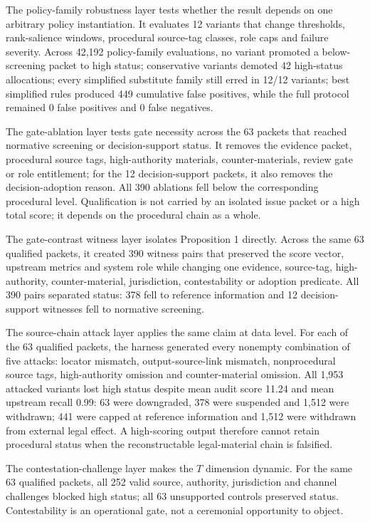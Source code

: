 \documentclass[12pt,a4paper]{article}
\begin{document}
The policy-family robustness layer tests whether the result depends on one arbitrary policy instantiation. It evaluates 12 variants that change thresholds, rank-salience windows, procedural source-tag classes, role caps and failure severity. Across 42,192 policy-family evaluations, no variant promoted a below-screening packet to high status; conservative variants demoted 42 high-status allocations; every simplified substitute family still erred in 12/12 variants; best simplified rules produced 449 cumulative false positives, while the full protocol remained 0 false positives and 0 false negatives.

The gate-ablation layer tests gate necessity across the 63 packets that reached normative screening or decision-support status. It removes the evidence packet, procedural source tags, high-authority materials, counter-materials, review gate or role entitlement; for the 12 decision-support packets, it also removes the decision-adoption reason. All 390 ablations fell below the corresponding procedural level. Qualification is not carried by an isolated issue packet or a high total score; it depends on the procedural chain as a whole.

The gate-contrast witness layer isolates Proposition 1 directly. Across the same 63 qualified packets, it created 390 witness pairs that preserved the score vector, upstream metrics and system role while changing one evidence, source-tag, high-authority, counter-material, jurisdiction, contestability or adoption predicate. All 390 pairs separated status: 378 fell to reference information and 12 decision-support witnesses fell to normative screening.

The source-chain attack layer applies the same claim at data level. For each of the 63 qualified packets, the harness generated every nonempty combination of five attacks: locator mismatch, output-source-link mismatch, nonprocedural source tags, high-authority omission and counter-material omission. All 1,953 attacked variants lost high status despite mean audit score 11.24 and mean upstream recall 0.99: 63 were downgraded, 378 were suspended and 1,512 were withdrawn; 441 were capped at reference information and 1,512 were withdrawn from external legal effect. A high-scoring output therefore cannot retain procedural status when the reconstructable legal-material chain is falsified.

The contestation-challenge layer makes the $T$ dimension dynamic. For the same 63 qualified packets, all 252 valid source, authority, jurisdiction and channel challenges blocked high status; all 63 unsupported controls preserved status. Contestability is an operational gate, not a ceremonial opportunity to object.
\end{document}
